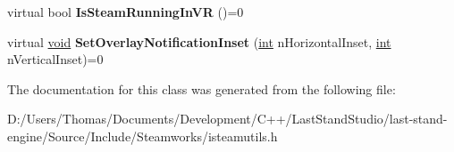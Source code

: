 \begin{DoxyCompactItemize}
\item 
\hypertarget{classISteamUtils_a53c51ba1d343e9f4dbba5bfd553f5a37}{}virtual bool {\bfseries Is\+Steam\+Running\+In\+V\+R} ()=0\label{classISteamUtils_a53c51ba1d343e9f4dbba5bfd553f5a37}

\item 
\hypertarget{classISteamUtils_a3d198c6ed15819d645b241eaefb0a73e}{}virtual \hyperlink{SDL__audio_8h_a52835ae37c4bb905b903cbaf5d04b05f}{void} {\bfseries Set\+Overlay\+Notification\+Inset} (\hyperlink{SDL__thread_8h_a6a64f9be4433e4de6e2f2f548cf3c08e}{int} n\+Horizontal\+Inset, \hyperlink{SDL__thread_8h_a6a64f9be4433e4de6e2f2f548cf3c08e}{int} n\+Vertical\+Inset)=0\label{classISteamUtils_a3d198c6ed15819d645b241eaefb0a73e}

\end{DoxyCompactItemize}


The documentation for this class was generated from the following file\+:\begin{DoxyCompactItemize}
\item 
D\+:/\+Users/\+Thomas/\+Documents/\+Development/\+C++/\+Last\+Stand\+Studio/last-\/stand-\/engine/\+Source/\+Include/\+Steamworks/isteamutils.\+h\end{DoxyCompactItemize}
